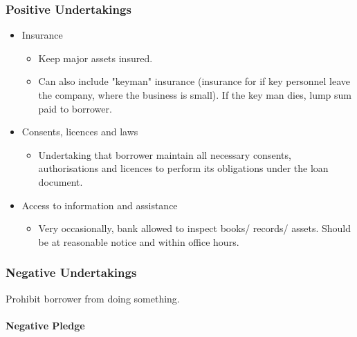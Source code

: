\documentclass[
]{article}
\providecommand{\tightlist}{%
  \setlength{\itemsep}{0pt}\setlength{\parskip}{0pt}}
\begin{document}
\hypertarget{positive-undertakings}{%
\subsubsection{Positive Undertakings}\label{positive-undertakings}}

\begin{itemize}
\tightlist
\item
  Insurance

  \begin{itemize}
  \tightlist
  \item
    Keep major assets insured.
  \item
    Can also include "keyman" insurance (insurance for if key personnel
    leave the company, where the business is small). If the key man
    dies, lump sum paid to borrower.
  \end{itemize}
\item
  Consents, licences and laws

  \begin{itemize}
  \tightlist
  \item
    Undertaking that borrower maintain all necessary consents,
    authorisations and licences to perform its obligations under the
    loan document.
  \end{itemize}
\item
  Access to information and assistance

  \begin{itemize}
  \tightlist
  \item
    Very occasionally, bank allowed to inspect books/ records/ assets.
    Should be at reasonable notice and within office hours.
  \end{itemize}
\end{itemize}

\hypertarget{negative-undertakings}{%
\subsubsection{Negative Undertakings}\label{negative-undertakings}}

Prohibit borrower from doing something.

\hypertarget{negative-pledge}{%
\paragraph{Negative Pledge}\label{negative-pledge}}
\end{document}
